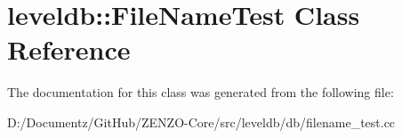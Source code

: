 \hypertarget{classleveldb_1_1_file_name_test}{}\section{leveldb\+::File\+Name\+Test Class Reference}
\label{classleveldb_1_1_file_name_test}


The documentation for this class was generated from the following file\+:\begin{DoxyCompactItemize}
\item 
D\+:/\+Documentz/\+Git\+Hub/\+Z\+E\+N\+Z\+O-\/\+Core/src/leveldb/db/filename\+\_\+test.\+cc\end{DoxyCompactItemize}
